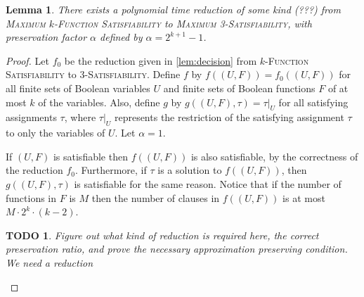 \documentclass[]{article}
\theoremstyle{plain}
\newtheorem{lemma}{Lemma}
\newtheorem{todo}{TODO}
\theoremstyle{definition}
\begin{document}
\begin{lemma}\label{lem:opt}
  There exists a polynomial time reduction of some kind (???) from \textsc{Maximum $k$-Function Satisfiability} to \textsc{Maximum 3-Satisfiability}, with preservation factor $\alpha$ defined by $\alpha = 2^{k + 1} - 1$.
\end{lemma}
\begin{proof}
  Let $f_0$ be the reduction given in \autoref{lem:decision} from \textsc{$k$-Function Satisfiability} to \textsc{3-Satisfiability}.
  Define $f$ by $f((U, F)) = f_0((U, F))$ for all finite sets of Boolean variables $U$ and finite sets of Boolean functions $F$ of at most $k$ of the variables.
  Also, define $g$ by $g((U, F), \tau) = \tau|_U$ for all satisfying assignments $\tau$, where $\tau|_U$ represents the restriction of the satisfying assignment $\tau$ to only the variables of $U$.
  Let $\alpha = 1$.

  If $(U, F)$ is satisfiable then $f((U, F))$ is also satisfiable, by the correctness of the reduction $f_0$.
  Furthermore, if $\tau$ is a solution to $f((U, F))$, then $g((U, F), \tau)$ is satisfiable for the same reason.
  Notice that if the number of functions in $F$ is $M$ then the number of clauses in $f((U, F))$ is at most $M \cdot 2^k \cdot (k - 2)$.

  \begin{todo}
    Figure out what kind of reduction is required here, the correct preservation ratio, and prove the necessary approximation preserving condition.
    We need a reduction
  \end{todo}


\end{proof}
\end{document}

